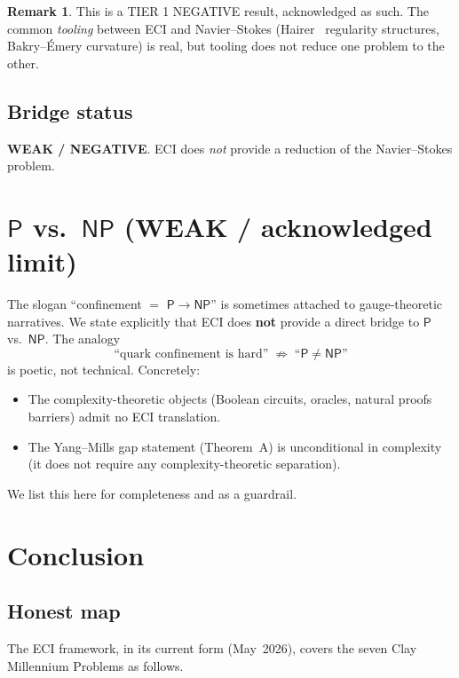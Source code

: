 \documentclass[11pt,a4paper]{article}
\theoremstyle{definition}
\newtheorem{remark}[theorem]{Remark}
\begin{document}
\begin{remark}
This is a TIER 1 NEGATIVE result, acknowledged as such. The common
\emph{tooling} between ECI and Navier--Stokes
(Hairer~\cite{HairerRegStruct} regularity structures, Bakry--\'Emery
curvature) is real, but tooling does not reduce one problem to the
other.
\end{remark}

\subsection{Bridge status}
\textbf{WEAK / NEGATIVE}. ECI does \emph{not} provide a reduction of
the Navier--Stokes problem.

\section{$\mathsf{P}$ vs.\ $\mathsf{NP}$ (WEAK / acknowledged limit)}
\label{sec:PNP}

The slogan ``confinement $=$ $\mathsf{P}\to\mathsf{NP}$'' is sometimes
attached to gauge-theoretic narratives. We state explicitly that
ECI does \textbf{not} provide a direct bridge to $\mathsf{P}$
vs.~$\mathsf{NP}$. The analogy
\[
\text{``quark confinement is hard''} \;\not\Longrightarrow\;
\text{``$\mathsf{P}\neq\mathsf{NP}$''}
\]
is poetic, not technical. Concretely:
\begin{itemize}
  \item The complexity-theoretic objects (Boolean circuits, oracles,
        natural proofs barriers) admit no ECI translation.
  \item The Yang--Mills gap statement (Theorem~A) is unconditional in
        complexity (it does not require any complexity-theoretic
        separation).
\end{itemize}
We list this here for completeness and as a guardrail.

\section{Conclusion}
\label{sec:concl}

\subsection{Honest map}
The ECI framework, in its current form (May~2026), covers the seven
Clay Millennium Problems as follows.
\end{document}
